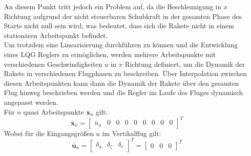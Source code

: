 An diesem Punkt tritt jedoch ein Problem auf, da die Beschleunigung in $x$ Richtung aufgrund der nicht steuerbaren Schubkraft in der gesamten Phase des Starts nicht null sein wird, was bedeutet, dass sich die Rakete nicht in einem stationären Arbeitspunkt befindet. 
\\
Um trotzdem eine Linearisierung durchführen zu können und die Entwicklung eines LQG Reglers zu ermöglichen, werden mehrere Arbeitspunkte mit verschiedenen Geschwindigkeiten $u$ in $x$ Richtung definiert, um die Dynamik der Rakete in verschiedenen Flugphasen zu beschreiben. Über Interpolation zwischen diesen Arbeitspunkten kann dann die Dynamik der Rakete über den gesamten Flug hinweg beschrieben werden und die Regler im Laufe des Fluges dynamisch angepasst werden.
\\
Für $n$ quasi Arbeitspunkte $\bar{\mathbf{x}}_n$ gilt:
\begin{equation}
\bar{\mathbf{x}}_n =
\begin{bmatrix}{u}_n & 0 & 0 & 0 & 0 & 0 & 0 & 0 & 0
\end{bmatrix}^{T}
\end{equation}
Wobei für die Eingangsgrößen $u$ im Vertikalflug gilt:
\begin{equation}\bar{\mathbf{u}}_n =
\begin{bmatrix}\delta_{\eta} & \delta_{\zeta} & \delta_{r}
\end{bmatrix}^{T}
= 
\begin{bmatrix}0 & 0 & 0
\end{bmatrix}^{T}
\end{equation}

